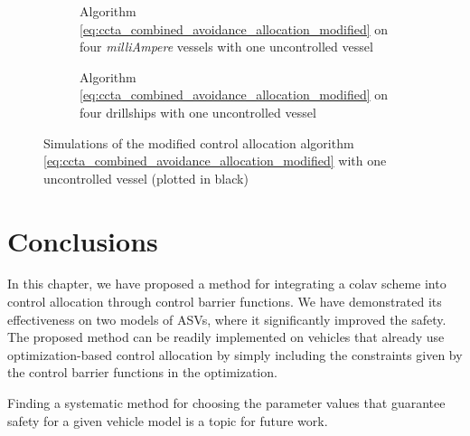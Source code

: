 \begin{figure*}[t]
    \centering
    \begin{subfigure}{\linewidth}
        \centering
        
        \caption{Algorithm \eqref{eq:ccta_combined_avoidance_allocation_modified} on four \emph{milliAmpere} vessels with one uncontrolled vessel}
        \vspace{0em}
    \end{subfigure}
    \begin{subfigure}{\linewidth}
        \centering
        
        \caption{Algorithm \eqref{eq:ccta_combined_avoidance_allocation_modified} on four drillships with one uncontrolled vessel}
        \label{fig:ccta_drillship_unc}
        \vspace{-1.5mm}
    \end{subfigure}
    \caption{Simulations of the modified control allocation algorithm \eqref{eq:ccta_combined_avoidance_allocation_modified} with one uncontrolled vessel (plotted in black)}
    \label{fig:ccta_uncontrolled}
    \vspace{-6mm}
\end{figure*}

\section{Conclusions}
\label{sec:ccta_conclusion}
In this chapter, we have proposed a method for integrating a \gls{colav} scheme into control allocation through control barrier functions.
We have demonstrated its effectiveness on two models of ASVs, where it significantly improved the safety.
The proposed method can be readily implemented on vehicles that already use optimization-based control allocation by simply including the constraints given by the control barrier functions in the optimization.

Finding a systematic method for choosing the parameter values that guarantee safety for a given vehicle model is a topic for future work.
